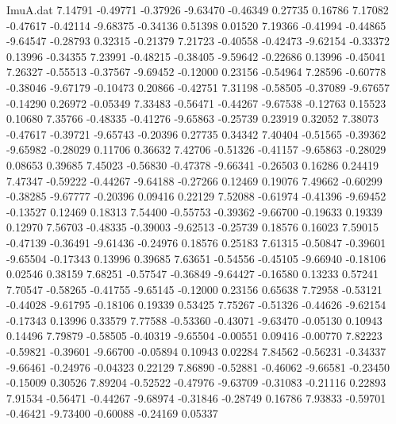\begin{filecontents}{ImuA.dat}
   7.14791   -0.49771   -0.37926   -9.63470   -0.46349    0.27735    0.16786
   7.17082   -0.47617   -0.42114   -9.68375   -0.34136    0.51398    0.01520
   7.19366   -0.41994   -0.44865   -9.64547   -0.28793    0.32315   -0.21379
   7.21723   -0.40558   -0.42473   -9.62154   -0.33372    0.13996   -0.34355
   7.23991   -0.48215   -0.38405   -9.59642   -0.22686    0.13996   -0.45041
   7.26327   -0.55513   -0.37567   -9.69452   -0.12000    0.23156   -0.54964
   7.28596   -0.60778   -0.38046   -9.67179   -0.10473    0.20866   -0.42751
   7.31198   -0.58505   -0.37089   -9.67657   -0.14290    0.26972   -0.05349
   7.33483   -0.56471   -0.44267   -9.67538   -0.12763    0.15523    0.10680
   7.35766   -0.48335   -0.41276   -9.65863   -0.25739    0.23919    0.32052
   7.38073   -0.47617   -0.39721   -9.65743   -0.20396    0.27735    0.34342
   7.40404   -0.51565   -0.39362   -9.65982   -0.28029    0.11706    0.36632
   7.42706   -0.51326   -0.41157   -9.65863   -0.28029    0.08653    0.39685
   7.45023   -0.56830   -0.47378   -9.66341   -0.26503    0.16286    0.24419
   7.47347   -0.59222   -0.44267   -9.64188   -0.27266    0.12469    0.19076
   7.49662   -0.60299   -0.38285   -9.67777   -0.20396    0.09416    0.22129
   7.52088   -0.61974   -0.41396   -9.69452   -0.13527    0.12469    0.18313
   7.54400   -0.55753   -0.39362   -9.66700   -0.19633    0.19339    0.12970
   7.56703   -0.48335   -0.39003   -9.62513   -0.25739    0.18576    0.16023
   7.59015   -0.47139   -0.36491   -9.61436   -0.24976    0.18576    0.25183
   7.61315   -0.50847   -0.39601   -9.65504   -0.17343    0.13996    0.39685
   7.63651   -0.54556   -0.45105   -9.66940   -0.18106    0.02546    0.38159
   7.68251   -0.57547   -0.36849   -9.64427   -0.16580    0.13233    0.57241
   7.70547   -0.58265   -0.41755   -9.65145   -0.12000    0.23156    0.65638
   7.72958   -0.53121   -0.44028   -9.61795   -0.18106    0.19339    0.53425
   7.75267   -0.51326   -0.44626   -9.62154   -0.17343    0.13996    0.33579
   7.77588   -0.53360   -0.43071   -9.63470   -0.05130    0.10943    0.14496
   7.79879   -0.58505   -0.40319   -9.65504   -0.00551    0.09416   -0.00770
   7.82223   -0.59821   -0.39601   -9.66700   -0.05894    0.10943    0.02284
   7.84562   -0.56231   -0.34337   -9.66461   -0.24976   -0.04323    0.22129
   7.86890   -0.52881   -0.46062   -9.66581   -0.23450   -0.15009    0.30526
   7.89204   -0.52522   -0.47976   -9.63709   -0.31083   -0.21116    0.22893
   7.91534   -0.56471   -0.44267   -9.68974   -0.31846   -0.28749    0.16786
   7.93833   -0.59701   -0.46421   -9.73400   -0.60088   -0.24169    0.05337

\end{filecontents}
